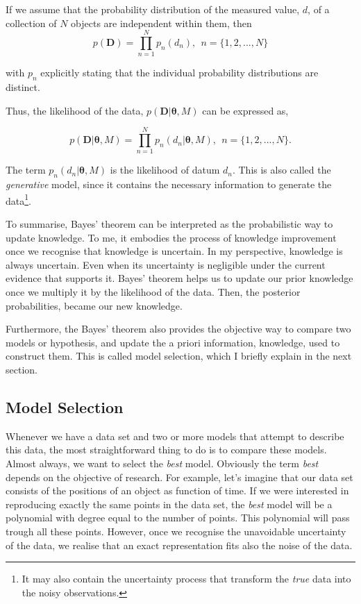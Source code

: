 If we assume that the probability distribution of the measured value, $d$, of a collection of $N$ objects are independent within them, then
\begin{equation}
\label{eq:independence}
 p(\mathbf{D}) = \prod_{n=1}^N p_n(d_n), \ \ n=\{1,2,...,N\}
\end{equation}

 with $p_n$ explicitly stating that the individual probability distributions are distinct. 
 
 Thus, the likelihood of the data, $p(\mathbf{D}|\mathbf{\theta},M)$ can be expressed as,

\begin{equation}
\label{eq:lik_datum}
 p(\mathbf{D}|\mathbf{\theta},M) = \prod_{n=1}^N p_n(d_n|\mathbf{\theta},M), \ \ n=\{1,2,...,N\}.
\end{equation}

The term $p_n(d_n|\mathbf{\theta},M)$ is the likelihood of datum $d_n$. This is also called the \emph{generative} model, since it  contains the necessary information to generate the data\footnote{It may also contain the uncertainty process that transform the \emph{true} data into the noisy observations.}.

To summarise, Bayes' theorem can be interpreted as the probabilistic way to update knowledge. To me, it embodies the process of knowledge improvement once we recognise that knowledge is uncertain. In my perspective, knowledge is always uncertain. Even when its uncertainty is negligible under the current evidence that supports it. Bayes' theorem helps us to update our prior knowledge once we multiply it by the likelihood of the data. Then, the posterior probabilities, became our new knowledge. 

Furthermore, the Bayes' theorem also provides the objective way to compare two models or hypothesis, and update the a priori information, knowledge, used to construct them. This is called model selection, which I  briefly explain in the next section.

\subsection{Model Selection}
\label{sect:modelselection}

Whenever we have a data set and two or more models that attempt to describe this data, the most straightforward thing to do is to compare these models. Almost always, we want to select the \emph{best} model. Obviously the term \emph{best} depends on the objective of research. For example, let's imagine that our data set consists of the positions of an object as function of time. If we were interested in reproducing exactly the same points in the data set, the \emph{best} model will be a polynomial with degree equal to the number of points. This polynomial will pass trough all these points. However, once we recognise the unavoidable uncertainty of the data, we realise that an exact representation fits also the noise of the data. 

